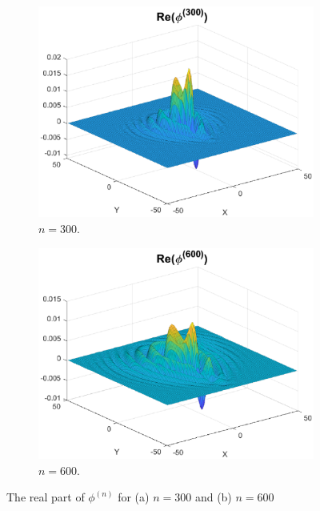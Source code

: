 \documentclass[11pt, letter]{book}
\newenvironment{example}
  {\pushQED{\qed}\renewcommand{\qedsymbol}{$\triangle$}\examplex}
  {\popQED\endexamplex}
\begin{document}
\begin{example}
\begin{figure}[!htb]
    \begin{subfigure}{0.49\textwidth}
    \centering
    \includegraphics[scale=0.54]{conv_ex0.eps}
    \caption{$n = 300$.}
    \end{subfigure}
    \begin{subfigure}{0.49\textwidth}
    \centering
    \includegraphics[scale=0.54]{conv_ex1.eps}
    \caption{$n = 600$.}
    \end{subfigure}
    \caption{The real part of $\phi^{(n)}$ for (a) $n=300$ and (b) $n=600$}
    \label{fig:conv_1}
\end{figure}
\end{example}
\end{document}
